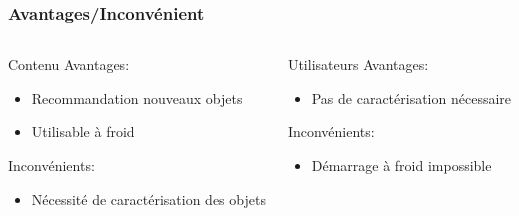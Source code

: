 \documentclass{beamer}
\begin{document}
            \begin{frame}
                \frametitle{Avantages/Inconvénient}
                \begin{columns}[t]
                    \begin{column}{4cm}
                        \begin{block}{Contenu}
                            \pause
                            Avantages:
                            \begin{itemize}
                                \pause
                                \item Recommandation nouveaux objets
                                \pause
                                \item Utilisable à froid
                            \end{itemize}
                            \pause
                            Inconvénients:
                            \begin{itemize}
                                \pause
                            \item Nécessité de caractérisation des objets
                            \end{itemize}
                        \end{block}
                    \end{column}
                    \pause
                    \begin{column}{4cm}
                        \begin{block}{Utilisateurs}
                        \pause
                        Avantages:
                        \begin{itemize}
                            \pause
                            \item Pas de caractérisation nécessaire
                        \end{itemize}
                        \pause
                        Inconvénients:
                        \begin{itemize}
                            \pause
                            \item Démarrage à froid impossible
                        \end{itemize}
                        \end{block}
                    \end{column}
                \end{columns}
            \end{frame}
\end{document}
